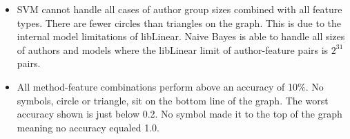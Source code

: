 \begin{itemize}
		\item SVM cannot handle all cases of author group sizes combined with all feature types.  There are fewer circles than triangles on the graph.  This is due to the internal model limitations of libLinear.  Naive Bayes is able to handle all sizes of authors and models where the libLinear limit of author-feature pairs is $2^{31}$ pairs.
		\item All method-feature combinations perform above an accuracy of 10\%. No symbols, circle or triangle, sit on the bottom line of the graph.  The worst accuracy shown is just below 0.2. No symbol made it to the top of the graph meaning no accuracy equaled 1.0.
	\end{itemize}
		
	
				
